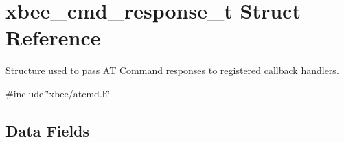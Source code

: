 \hypertarget{structxbee__cmd__response__t}{\section{xbee\-\_\-cmd\-\_\-response\-\_\-t Struct Reference}
\label{structxbee__cmd__response__t}
}


Structure used to pass A\-T Command responses to registered callback handlers.  




{\ttfamily \#include \char`\"{}xbee/atcmd.\-h\char`\"{}}

\subsection*{Data Fields}
